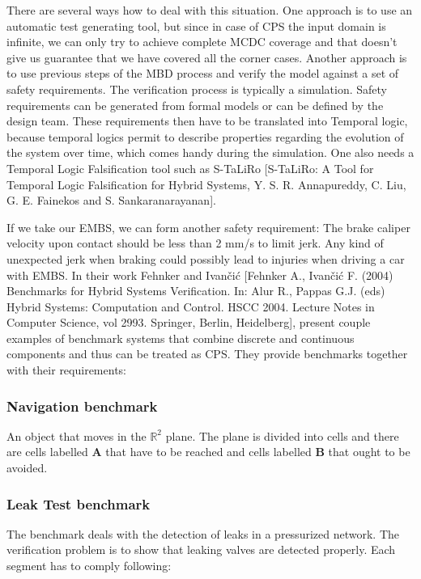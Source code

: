 There are several ways how to deal with this situation. One approach is to use an automatic test generating tool, but since in case of CPS the input domain is infinite, we can only try to achieve complete MCDC coverage and that doesn't give us guarantee that we have covered all the corner cases. Another approach is to use previous steps of the MBD process and verify the model against a set of safety requirements. The verification process is typically a simulation. Safety requirements can be generated from formal models or can be defined by the design team. These requirements then have to be translated into Temporal logic, because temporal logics permit to describe properties regarding the evolution of the system over time, which comes handy during the simulation. One also needs a Temporal Logic Falsification tool such as S-TaLiRo [S-TaLiRo: A Tool for Temporal Logic Falsification for Hybrid Systems, Y. S. R. Annapureddy, C. Liu, G. E. Fainekos and S. Sankaranarayanan].

If we take our EMBS, we can form another safety requirement: The brake caliper velocity upon contact should be less than 2 mm/s to limit jerk. Any kind of unexpected jerk when braking could possibly lead to injuries when driving a car with EMBS. In their work Fehnker and Ivančić [Fehnker A., Ivančić F. (2004) Benchmarks for Hybrid Systems Verification. In: Alur R., Pappas G.J. (eds) Hybrid Systems: Computation and Control. HSCC 2004. Lecture Notes in Computer Science, vol 2993. Springer, Berlin, Heidelberg], present couple examples of benchmark systems that combine discrete and continuous components and thus can be treated as CPS. They provide benchmarks together with their requirements:

\subsubsection{Navigation benchmark}

An object that moves in the ${\mathbb{R}}^2$ plane. The plane is divided into cells and there are cells labelled \textbf{A} that have to be reached and cells labelled \textbf{B} that ought to be avoided.

\subsubsection{Leak Test benchmark}

The benchmark deals with the detection of leaks in a pressurized network. The verification problem is to show that leaking valves are detected properly. Each segment has to comply following:

